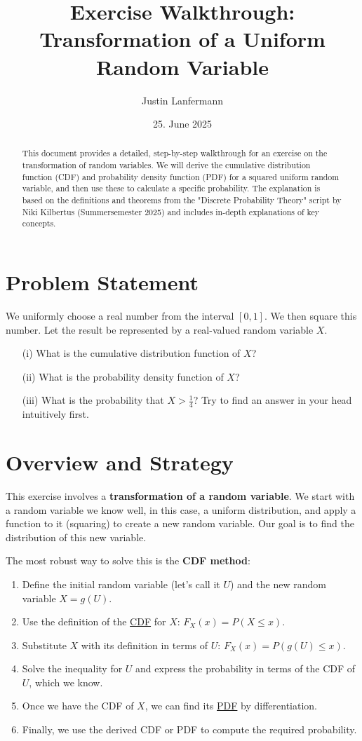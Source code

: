 \documentclass[11pt,a4paper]{article}
\author{Justin Lanfermann}
\title{Exercise Walkthrough: Transformation of a Uniform Random Variable}
\date{25. June 2025}
\newcommand{\conceptlink}[2]{\hyperlink{#1}{#2}}
\begin{document}
\maketitle

\begin{abstract}
    This document provides a detailed, step-by-step walkthrough for an exercise on the transformation of random variables. We will derive the cumulative distribution function (CDF) and probability density function (PDF) for a squared uniform random variable, and then use these to calculate a specific probability. The explanation is based on the definitions and theorems from the "Discrete Probability Theory" script by Niki Kilbertus (Summersemester 2025) and includes in-depth explanations of key concepts.
\end{abstract}

\section{Problem Statement}

We uniformly choose a real number from the interval $[0, 1]$. We then square this number. Let the result be represented by a real-valued random variable $X$.
\begin{enumerate}
    \item[(i)] What is the cumulative distribution function of $X$?
    \item[(ii)] What is the probability density function of $X$?
    \item[(iii)] What is the probability that $X > \frac{1}{4}$? Try to find an answer in your head intuitively first.
\end{enumerate}

\section{Overview and Strategy}
This exercise involves a \textbf{transformation of a random variable}. We start with a random variable we know well, in this case, a uniform distribution, and apply a function to it (squaring) to create a new random variable. Our goal is to find the distribution of this new variable.

The most robust way to solve this is the \textbf{CDF method}:
\begin{enumerate}
    \item Define the initial random variable (let's call it $U$) and the new random variable $X = g(U)$.
    \item Use the definition of the \conceptlink{concept:cdf}{CDF} for $X$: $F_X(x) = P(X \leq x)$.
    \item Substitute $X$ with its definition in terms of $U$: $F_X(x) = P(g(U) \leq x)$.
    \item Solve the inequality for $U$ and express the probability in terms of the CDF of $U$, which we know.
    \item Once we have the CDF of $X$, we can find its \conceptlink{concept:pdf}{PDF} by differentiation.
    \item Finally, we use the derived CDF or PDF to compute the required probability.
\end{enumerate}
\end{document}
